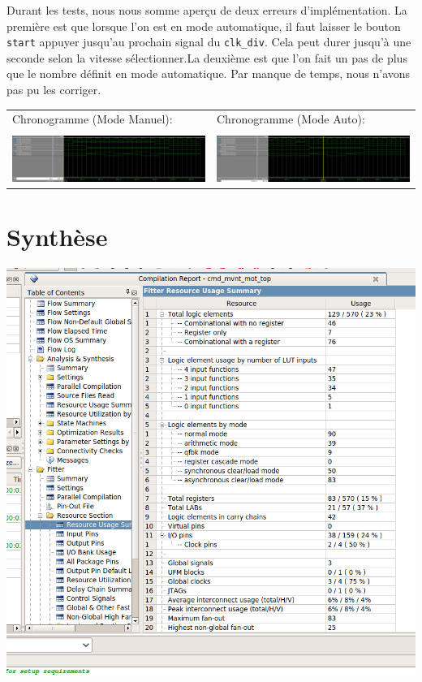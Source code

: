 \documentclass[10pt,a4paper]{article}
\begin{document}
Durant les tests, nous nous somme aperçu de deux erreurs d'implémentation. La première est que lorsque l'on est en mode automatique, il faut laisser le bouton \texttt{start} appuyer jusqu'au prochain signal du \texttt{clk\_div}. Cela peut durer jusqu'à une seconde selon la vitesse sélectionner.La deuxième est que l'on fait un pas de plus que le nombre définit en mode automatique. Par manque de temps, nous n'avons pas pu les corriger.

\begin{tabular}{ll}

Chronogramme (Mode Manuel): & Chronogramme (Mode Auto):\\\\
\includegraphics[angle=90,scale=0.45]{images/manualSim.jpg} & \includegraphics[angle=90,scale=0.45]{images/autoSim.jpg}\\

\end{tabular}
\newpage
\section{Synthèse}
\includegraphics[scale=0.45]{images/summaryQuartus.png}\\
\end{document}
